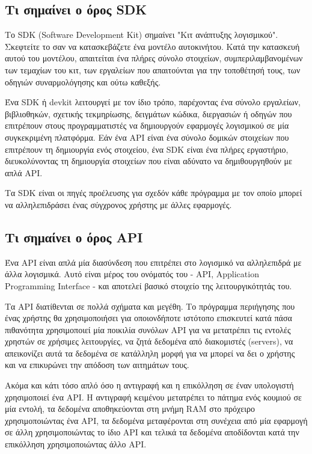 \documentclass[a4paper,12pt]{article}
\begin{document}
		\newpage
		\subsection{Τι σημαίνει ο όρος SDK}
			
			Το SDK (Software Development Kit) σημαίνει "Κιτ ανάπτυξης λογισμικού". Σκεφτείτε το σαν να κατασκεβάζετε ένα μοντέλο αυτοκινήτου. Κατά την κατασκευή αυτού του μοντέλου,
			απαιτείται ένα πλήρες σύνολο στοιχείων, συμπεριλαμβανομένων των τεμαχίων του κιτ, των εργαλείων που απαιτούνται για την τοποθέτησή τους, των οδηγιών συναρμολόγησης και ούτω
			καθεξής.
			
			Ένα SDK ή devkit λειτουργεί με τον ίδιο τρόπο, παρέχοντας ένα σύνολο εργαλείων, βιβλιοθηκών, σχετικής τεκμηρίωσης, δειγμάτων κώδικα, διεργασιών ή οδηγών που επιτρέπουν στους
			προγραμματιστές να δημιουργούν εφαρμογές λογισμικού σε μία συγκεκριμένη πλατφόρμα. Εάν ένα API είναι ένα σύνολο δομικών στοιχείων που επιτρέπουν τη δημιουργία ενός στοιχείου,
			ένα SDK είναι ένα πλήρες εργαστήριο, διευκολύνοντας τη δημιουργία στοιχείων που είναι αδύνατο να δημιθουργηθούν με απλά API.
			
			Τα SDK είναι οι πηγές προέλευσης για σχεδόν κάθε πρόγραμμα με τον οποίο μπορεί να αλληλεπιδράσει ένας σύγχρονος χρήστης με άλλες εφαρμογές.
		\newpage
		\subsection{Τι σημαίνει ο όρος API}
		
			Ένα API είναι απλά μία διασύνδεση που επιτρέπει στο λογισμικό να αλληλεπιδρά με άλλα λογισμικά. Αυτό είναι μέρος του ονόματός του - API, Application Programming Interface - και 
			αποτελεί βασικό στοιχείο της λειτουργικότητάς του.
			
			Τα API διατίθενται σε πολλά σχήματα και μεγέθη. Το πρόγραμμα περιήγησης που ένας χρήστης θα χρησιμοποιήσει για οποιονδήποτε ιστότοπο επισκευτεί κατά πάσα πιθανότητα 
			χρησιμοποιεί μία ποικιλία συνόλων API για να μετατρέπει τις εντολές χρηστών σε χρήσιμες λειτουργίες, να ζητά δεδομένα από διακομιστές (servers), να απεικονίζει αυτά τα δεδομένα σε 
			κατάλληλη μορφή για να μπορεί να δει ο χρήστης και να επικυρώνει την απόδοση των αιτημάτων τους.
			
			Ακόμα και κάτι τόσο απλό όσο η αντιγραφή και η επικόλληση σε έναν υπολογιστή χρησιμοποιεί ένα API. Η αντιγραφή κειμένου μετατρέπει το πάτημα ενός κουμιού σε μία εντολή, τα δεδομένα 
			αποθηκεύονται στη μνήμη RAM στο πρόχειρο χρησιμοποιώντας ένα API, τα δεδομένα μεταφέρονται στη συνέχεια από μία εφαρμογή σε άλλη χρησιμοποιώντας το ίδιο API και τελικά τα δεδομένα 
			αποδίδονται κατά την επικόλληση χρησιμοποιώντας άλλο API. 
			
\end{document}

